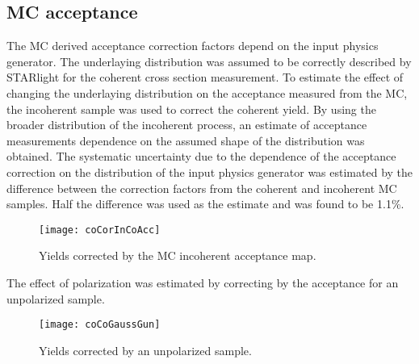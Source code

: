     \subsection{MC acceptance}
      The MC derived acceptance correction factors depend on the input physics
        generator. 
      The underlaying \pt{} distribution was assumed to be correctly 
        described by STARlight for the coherent cross section measurement.
      To estimate the effect of changing the underlaying \pt{} distribution 
        on the acceptance measured from the MC, the incoherent sample was used 
        to correct the coherent yield.
      By using the broader \pt{} distribution of the incoherent process, an 
        estimate of acceptance measurements dependence on the assumed shape of
        the \pt{} distribution was obtained.
      The systematic uncertainty due to the dependence of the acceptance 
        correction on the \pt{} distribution of the input physics generator
        was estimated by the difference between the correction factors from 
        the coherent and incoherent MC samples. 
      Half the difference was used as the estimate and was found to be 1.1\%.

      \begin{figure}[!Hhbt]
        \centering
        \texttt{[image: coCorInCoAcc]}
        \caption{Yields corrected by the MC incoherent acceptance map.}
        \label{fig:coYieldInCoCor}
      \end{figure}
      
      The effect of polarization was estimated by correcting by the acceptance
        for an unpolarized \JPsi{} sample.
      \begin{figure}[!Hhtb]
        \centering
        \texttt{[image: coCoGaussGun]}
        \caption{Yields corrected by an unpolarized \JPsi{} sample.}
        \label{fig:coYieldGaussCor}
      \end{figure}


